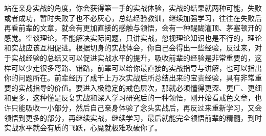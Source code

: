 站在亲身实战的角度，你会获得第一手的实战体验，实战的结果就两种可能，失败或者成功，暂时失败了也不必灰心，总结经验教训，继续加强学习，往往在失败后再看前辈的文章，就会有更加直接的感触与领悟，会有一种醍醐灌顶、茅塞顿开的感觉。空谈理论，不能解决实际问题，只讲实战，忽视理论知识也是不行的，理论和实战应该互相促进。根据切身的实战体会，你自己会得出一些经验，反过来，对于实战经验的总结又可以促进实战水平的提升，吸收前辈的经验是非常重要的，这样可以少走很多弯路、错路，前辈可以给你最直接的实战指导与讲解，也可以指出你的问题所在。前辈经历了成千上万次实战后所总结出来的宝贵经验，具有非常重要的实战指导的价值。要进入极稳定的戒色层次，那就必须懂得更深、更广、更细和更多，这种懂是反复实战和深入学习研究后的一种领悟，刚开始看戒色文章，也许只能吸收一小部分，然后自己亲身体验了念头实战后，再反过来重新学习，又会领悟到更多的部分，再继续实战，继续学习，最后就能完全领悟前辈的精髓，到时实战水平就会有质的飞跃，心魔就极难攻破你了。

